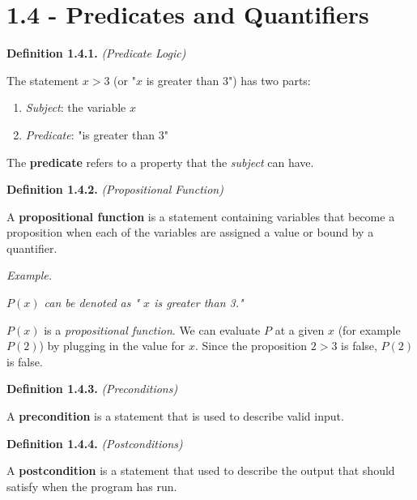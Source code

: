 \documentclass[12pt, letterpaper]{article}
\begin{document}
\maketitle

\section*{1.4 - Predicates and Quantifiers}

\textbf{Definition 1.4.1.} \textit{(Predicate Logic)}
\medskip

The statement $ x > 3 $ (or "$ x $ is greater than 3") has two parts:

\medskip
\begin{enumerate}
    \item \textit{Subject}: the variable $ x $
    \item \textit{Predicate}: "is greater than 3"
\end{enumerate}
\medskip

The \textbf{predicate} refers to a property that the \textit{subject} can have.

\bigskip
\bigskip

\textbf{Definition 1.4.2.} \textit{(Propositional Function)}
\medskip

A \textbf{propositional function} is a statement containing variables that become a proposition when each of the variables are assigned a value or bound by a quantifier.
\bigskip

\textit{Example.}
\medskip

\textit{$ P(x) $ can be denoted as " $ x $ is greater than 3."}
\medskip

$ P(x) $ is a \textit{propositional function}. We can evaluate $ P $ at a given $ x $ (for example $ P(2) $) by plugging in the value for $ x $. Since the proposition $ 2 > 3 $ is false, $ P(2) $ is false.


\bigskip
\bigskip

\textbf{Definition 1.4.3.} \textit{(Preconditions)}
\medskip

A \textbf{precondition} is a statement that is used to describe valid input.

\bigskip
\bigskip

\textbf{Definition 1.4.4.} \textit{(Postconditions)}
\medskip

A \textbf{postcondition} is a statement that used to describe the output that should satisfy when the program has run.
\end{document}
